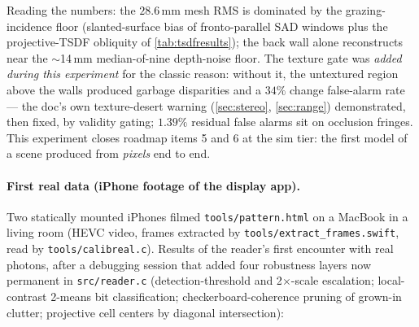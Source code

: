 \documentclass[11pt]{article}
\theoremstyle{definition}
\newcommand{\code}[1]{\texttt{#1}}
\begin{document}
Reading the numbers: the $28.6$\,mm mesh RMS is dominated by the
grazing-incidence floor (slanted-surface bias of fronto-parallel SAD
windows plus the projective-TSDF obliquity of
\autoref{tab:tsdfresults}); the back wall alone reconstructs near the
$\sim$14\,mm median-of-nine depth-noise floor. The texture gate was
\emph{added during this experiment} for the classic reason: without it,
the untextured region above the walls produced garbage disparities and a
$34\%$ change false-alarm rate --- the doc's own texture-desert warning
(\autoref{sec:stereo}, \autoref{sec:range}) demonstrated, then fixed,
by validity gating; $1.39\%$ residual false alarms sit on occlusion
fringes. This experiment closes roadmap items 5 and 6 at the sim tier:
the first model of a scene produced from \emph{pixels} end to end.

\paragraph{First real data (iPhone footage of the display app).} Two
statically mounted iPhones filmed \code{tools/pattern.html} on a
MacBook in a living room (HEVC video, frames extracted by
\code{tools/extract\_frames.swift}, read by \code{tools/calibreal.c}).
Results of the reader's first encounter with real photons, after a
debugging session that added four robustness layers now permanent in
\code{src/reader.c} (detection-threshold and 2$\times$-scale
escalation; local-contrast 2-means bit classification;
checkerboard-coherence pruning of grown-in clutter; projective cell
centers by diagonal intersection):
\end{document}
